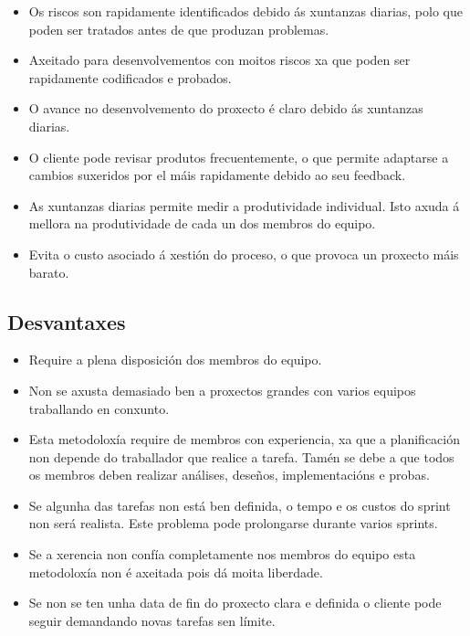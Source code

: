 \begin{itemize}
	\item Os riscos son rapidamente identificados debido ás xuntanzas diarias, polo que poden ser tratados antes de que produzan problemas.
	\item Axeitado para desenvolvementos con moitos riscos xa que poden ser rapidamente codificados e probados.
	\item O avance no desenvolvemento do proxecto é claro debido ás xuntanzas diarias.
	\item O cliente pode revisar produtos frecuentemente, o que permite adaptarse a cambios suxeridos por el máis rapidamente debido ao seu feedback.
	\item As xuntanzas diarias permite medir a produtividade individual. Isto axuda á mellora na produtividade de cada un dos membros do equipo.
	\item Evita o custo asociado á xestión do proceso, o que provoca un proxecto máis barato.
\end{itemize}

\subsection{Desvantaxes}

\begin{itemize}
	\item Require a plena disposición dos membros do equipo.
	\item Non se axusta demasiado ben a proxectos grandes con varios equipos traballando en conxunto.
	\item Esta metodoloxía require de membros con experiencia, xa que a planificación non depende do traballador que realice a tarefa. Tamén se debe a que todos os membros deben realizar análises, deseños, implementacións e probas.
	\item Se algunha das tarefas non está ben definida, o tempo e os custos do sprint non será realista. Este problema pode prolongarse durante varios sprints.
	\item Se a xerencia non confía completamente nos membros do equipo esta metodoloxía non é axeitada pois dá moita liberdade.
	\item Se non se ten unha data de fin do proxecto clara e definida o cliente pode seguir demandando novas tarefas sen límite.
\end{itemize}


